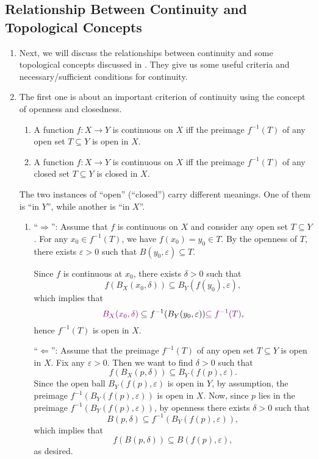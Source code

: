 \subsection{Relationship Between Continuity and Topological Concepts}
\begin{enumerate}
\item Next, we will discuss the relationships between continuity and some
topological concepts discussed in . They give us some
useful criteria and necessary/sufficient conditions for continuity.

\item The first one is about an important criterion of continuity using the
concept of openness and closedness.

\begin{theorem}
\label{thm:cts-crit-open-closed}
\hfill
\begin{enumerate}
\item A function \(f:X\to Y\) is continuous on \(X\) iff the preimage \(f^{-1}(T)\)
of any open set \(T\subseteq Y\) is open in \(X\).
\item A function \(f:X\to Y\) is continuous on \(X\) iff the preimage \(f^{-1}(T)\)
of any closed set \(T\subseteq Y\) is closed in \(X\).
\end{enumerate}
\end{theorem}
\begin{note}
The two instances of ``open'' (``closed'') carry different meanings. One of
them is ``in \(Y\)'', while another is ``in \(X\)''.
\end{note}

\begin{pf}
\hfill
\begin{enumerate}
\item ``\(\Rightarrow\)'': Assume that \(f\) is continuous on \(X\) and
consider any open set \(T\subseteq Y\). For any \(x_0\in f^{-1}(T)\), we have
\(f(x_0)=y_0\in T\). By the openness of \(T\), there exists \(\varepsilon>0\)
such that \(B(y_0,\varepsilon)\subseteq T\).

Since \(f\) is continuous at \(x_0\), there exists \(\delta>0\) such that
\[
f(B_X(x_0,\delta))\subseteq B_Y(f(y_0),\varepsilon),
\]
which implies that
\[
{\color{violet}B_X(x_0,\delta)}\subseteq f^{-1}(B_Y(y_0,\varepsilon)){\color{violet}\subseteq f^{-1}(T)},
\]
hence \(f^{-1}(T)\) is open in \(X\).

``\(\Leftarrow\)'': Assume that the preimage \(f^{-1}(T)\)
of any open set \(T\subseteq Y\) is open in \(X\). Fix any \(\varepsilon>0\).
Then we want to find \(\delta>0\) such that
\[
f(B_X(p,\delta))\subseteq B_Y(f(p),\varepsilon).
\]
Since the open ball \(B_Y(f(p),\varepsilon)\) is open in \(Y\), by assumption,
the preimage \(f^{-1}(B_Y(f(p),\varepsilon))\) is open in \(X\). Now, since
\(p\) lies in the preimage \(f^{-1}(B_Y(f(p),\varepsilon))\), by openness
there exists \(\delta>0\) such that
\[
B(p,\delta)\subseteq f^{-1}(B_Y(f(p),\varepsilon)),
\]
which implies that
\[
f(B(p,\delta))\subseteq B(f(p),\varepsilon),
\]
as desired.


\end{enumerate}
\end{pf}
\end{enumerate}
